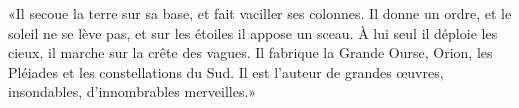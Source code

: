 «Il secoue la terre sur sa base, et fait vaciller ses colonnes.
Il donne un ordre, et le soleil ne se lève pas, et sur les étoiles il appose un sceau.
À lui seul il déploie les cieux, il marche sur la crête des vagues.
Il fabrique la Grande Ourse, Orion, les Pléiades et les constellations du Sud.
Il est l’auteur de grandes œuvres, insondables, d’innombrables merveilles.»
